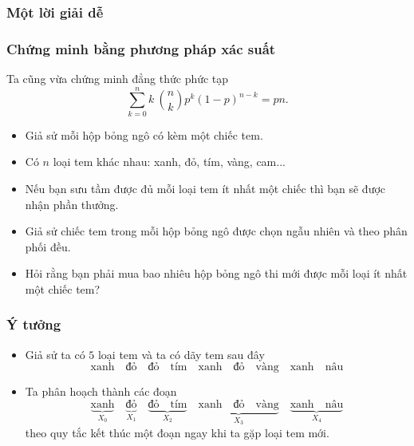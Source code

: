 \begin{frame}
  \frametitle{Một lời giải dễ }
  
\end{frame}

\begin{frame}
  \frametitle{Chứng minh bằng phương pháp xác suất }
  Ta cũng vừa chứng minh đẳng thức phức tạp 
$$
\sum_{k=0}^nk\ \binom{n}{k}p^k(1-p)^{n-k} = pn.
$$
\end{frame}


\begin{frame}
  \begin{prblm}
    \begin{itemize}
    \item Giả sử mỗi hộp bỏng ngô có kèm một chiếc tem.  
    \item Có $n$ loại
      tem khác nhau: xanh, đỏ, tím, vàng, cam... 
    \item Nếu bạn sưu tầm được  đủ mỗi  loại tem ít nhất một chiếc  thì bạn sẽ được
      nhận phần thưởng. 
    \item Giả sử chiếc tem trong mỗi hộp bỏng ngô được
      chọn ngẫu nhiên và theo phân phối đều.  
    \item Hỏi rằng bạn phải mua
      bao nhiêu hộp bỏng ngô thi mới được mỗi loại ít nhất một chiếc
      tem?
    \end{itemize}

  \end{prblm}
\end{frame}

\begin{frame}
  \frametitle{Ý tưởng }
  \begin{itemize}
  \item<+-> Giả sử ta có $5$ loại tem và ta có dãy tem sau đây
$$
\text{xanh}\quad \text{đỏ}\quad \text{đỏ} \quad \text{tím} \quad
\text{xanh} \quad \text{đỏ} \quad \text{vàng} \quad \text{xanh} \quad
\text{nâu}
$$
\item<+-> Ta phân hoạch thành các đoạn
$$
\underbrace{\text{xanh}}_{X_0}\quad \underbrace{\text{đỏ}}_{X_1}\quad
\underbrace{\text{đỏ} \quad \text{tím}}_{X_2} \quad
\underbrace{\text{xanh} \quad\text{đỏ}\quad \text{vàng}}_{X_3} \quad
\underbrace{\text{xanh} \quad \text{nâu}}_{X_4}
$$
theo quy tắc \alert{kết thúc một đoạn ngay khi ta gặp loại tem mới}.
\end{itemize}
\end{frame}

